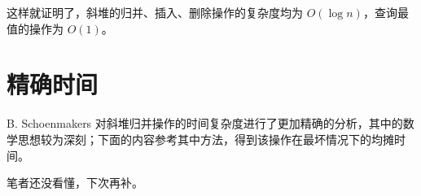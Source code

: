 \documentclass[a4paper]{ctexart}
\begin{document}
这样就证明了，斜堆的归并、插入、删除操作的复杂度均为 $O(\log n)$，查询最值的操作为 $O(1)$。

\section{精确时间}

B. Schoenmakers 对斜堆归并操作的时间复杂度进行了更加精确的分析，其中的数学思想较为深刻；下面的内容参考其中方法，得到该操作在最坏情况下的均摊时间。

笔者还没看懂，下次再补。



\end{document}
